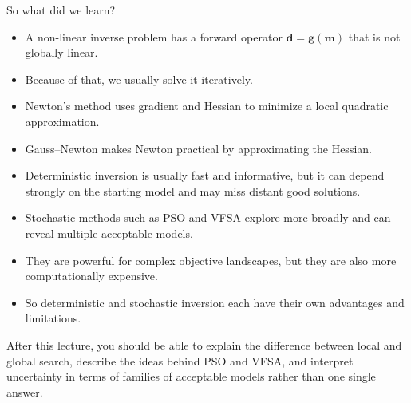\documentclass[aspectratio=169]{beamer}
\renewcommand{\vec}[1]{\mathbf{#1}}
\newcommand{\dd}{ {\vec{d}} }
\newcommand{\mm}{ {\vec{m}} }
\renewcommand{\gg}[1]{\vec{g}\left(#1\right)}
\begin{document}
\begin{frame}{So what did we learn?}
\small

{\setlength{\itemsep}{0.2em}
\begin{itemize}
    \item[--] A \alert{non-linear inverse problem} has a forward operator $\dd=\gg{\mm}$ that is not globally linear.
    \item[--] Because of that, we usually solve it \alert{iteratively}.
    \item[--] \alert{Newton's method} uses gradient and Hessian to minimize a local quadratic approximation.
    \item[--] \alert{Gauss--Newton} makes Newton practical by approximating the Hessian.
    \item[--] Deterministic inversion is usually fast and informative, but it can depend strongly on the starting model and may miss distant good solutions.

    \item[--] Stochastic methods such as PSO and VFSA explore more broadly and can reveal multiple acceptable models.
    \item[--] They are powerful for complex objective landscapes, but they are also more computationally expensive.
    \item[--] So deterministic and stochastic inversion each have their own \alert{advantages and limitations}.
\end{itemize}

\vspace{0.12cm}

After this lecture, you should be able to explain the difference between local and global search, describe the ideas behind PSO and VFSA, and interpret uncertainty in terms of families of acceptable models rather than one single answer.
}
\end{frame}
\end{document}
